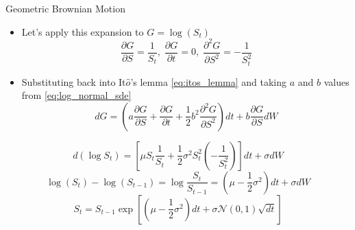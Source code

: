 \documentclass{beamer}
\begin{document}
\begin{frame}{Geometric Brownian Motion}
	\begin{itemize}
		\item<0-> Let's apply this expansion to $G=\log(S_t)$ 
		\begin{equation*}
			\frac{\partial G}{\partial S}=\frac{1}{S_t},\;\frac{\partial G}{\partial t}=0,\;\frac{\partial^2 G}{\partial S^2}=-\frac{1}{S_t^2}
		\end{equation*}
		\item<2-> Substituting back into It$\hat{o}$'s lemma \cref{eq:itos_lemma} and taking $a$ and $b$ values from \cref{eq:log_normal_sde}
		\begin{equation*}
			dG = \left(a\frac{\partial G}{\partial S} + \frac{\partial G}{\partial t} + \frac{1}{2}b^2\frac{\partial^2 G}{\partial S^2}\right)dt + b\frac{\partial G}{\partial S} dW
		\end{equation*}
	\end{itemize}
	\pause
	\pause
	\begin{equation*}
	d(\log S_t) = \left[\mu S_t\frac{1}{S_t} + \frac{1}{2}\sigma^2S_t^2\left(-\frac{1}{S_t^2}\right)\right]dt + \sigma dW
	\end{equation*}
	\pause
	\begin{equation*}
	\log(S_t) - \log(S_{t-1}) = \log\frac{S_t}{S_{t-1}}=\left(\mu - \frac{1}{2}\sigma^2\right)dt + \sigma dW 
	\end{equation*}	
	\pause
	\begin{equation}
	S_t = S_{t-1}\exp\left[\left(\mu-\frac{1}{2}\sigma^2\right)dt + \sigma\mathcal{N}(0,1)\sqrt{dt}\right] 
	\label{eq:lognormal_solution}
	\end{equation}
\end{frame}
\end{document}

